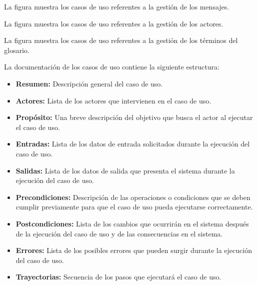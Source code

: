 
\clearpage
La figura  muestra los casos de uso referentes a la gestión de los mensajes.\\


\clearpage
La figura  muestra los casos de uso referentes a la gestión de los actores.\\


\clearpage
La figura  muestra los casos de uso referentes a la gestión de los términos del glosario.\\




\clearpage
La documentación de los casos de uso contiene la siguiente estructura:
 
    \begin{itemize}
	\item {\bf Resumen:} Descripción general del caso de uso.
	\item {\bf Actores:} Lista de los actores que intervienen en el caso de uso.
	\item {\bf Propósito:} Una breve descripción del objetivo que busca el actor al ejecutar el caso de uso.
	\item {\bf Entradas:} Lista de los datos de entrada solicitados durante la ejecución del caso de uso.
	\item {\bf Salidas:} Lista de los datos de salida que presenta el sistema durante la ejecución del caso de uso.
	\item {\bf Precondiciones:} Descripción de las operaciones o condiciones que se deben cumplir previamente para que el caso de uso pueda ejecutarse correctamente.
	\item {\bf Postcondiciones:} Lista de los cambios que ocurrirán en el sistema después de la ejecución del caso de uso y de las consecuencias en el sistema.
	\item {\bf Errores:} Lista de los posibles errores que pueden surgir durante la ejecución del caso de uso.
	\item {\bf Trayectorias:} Secuencia de los pasos que ejecutará el caso de uso.
    \end{itemize}
    